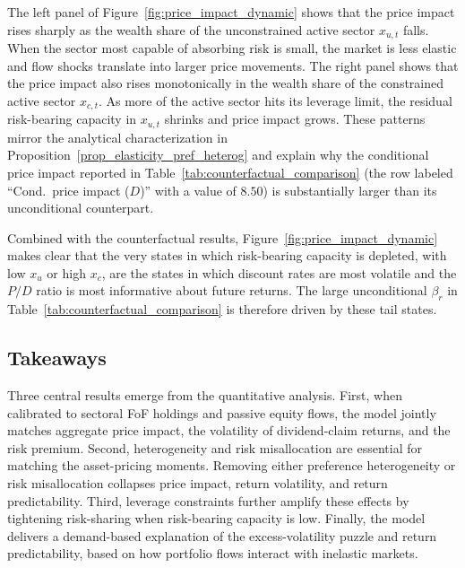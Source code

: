 \documentclass[12pt,english]{article}
\begin{document}
The left panel of Figure~\ref{fig:price_impact_dynamic} shows that the price impact rises sharply as the wealth share of the unconstrained active sector $x_{u,t}$ falls.
When the sector most capable of absorbing risk is small, the market is less elastic and flow shocks translate into larger price movements.
The right panel shows that the price impact also rises monotonically in the wealth share of the constrained active sector $x_{c,t}$.
As more of the active sector hits its leverage limit, the residual risk-bearing capacity in $x_{u,t}$ shrinks and price impact grows.
These patterns mirror the analytical characterization in Proposition~\ref{prop_elasticity_pref_heterog} and explain why the conditional price impact reported in Table~\ref{tab:counterfactual_comparison} (the row labeled ``Cond.\ price impact ($D$)'' with a value of $8.50$) is substantially larger than its unconditional counterpart.

Combined with the counterfactual results, Figure~\ref{fig:price_impact_dynamic} makes clear that the very states in which risk-bearing capacity is depleted, with low $x_u$ or high $x_c$, are the states in which discount rates are most volatile and the $P/D$ ratio is most informative about future returns.
The large unconditional $\beta_r$ in Table~\ref{tab:counterfactual_comparison} is therefore driven by these tail states.

\subsection{Takeaways}\label{sec:takeaways}

Three central results emerge from the quantitative analysis.
First, when calibrated to sectoral FoF holdings and passive equity flows, the model jointly matches aggregate price impact, the volatility of dividend-claim returns, and the risk premium.
Second, heterogeneity and risk misallocation are essential for matching the asset-pricing moments.
Removing either preference heterogeneity or risk misallocation collapses price impact, return volatility, and return predictability. 
Third, leverage constraints further amplify these effects by tightening risk-sharing when risk-bearing capacity is low.
Finally, the model delivers a demand-based explanation of the excess-volatility puzzle and return predictability, based on how portfolio flows interact with inelastic markets. 
\end{document}
